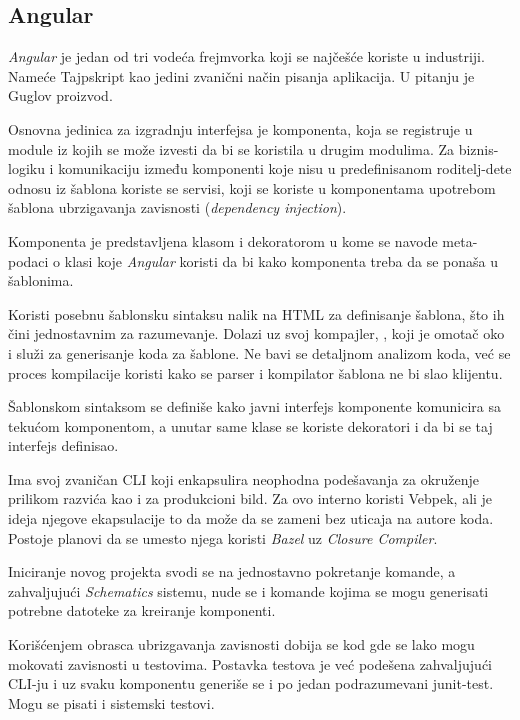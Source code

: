 \subsection{Angular}

\textsl{Angular} je jedan od tri vodeća frejmvorka koji se najčešće koriste u industriji.
Nameće Tajpskript kao jedini zvanični način pisanja aplikacija.
U pitanju je Guglov proizvod.

Osnovna jedinica za izgradnju interfejsa je komponenta, koja se registruje u module iz kojih se može izvesti da bi se koristila u drugim modulima.
Za biznis-logiku i komunikaciju između komponenti koje nisu u predefinisanom roditelj-dete odnosu iz šablona koriste se servisi, koji se koriste u komponentama upotrebom šablona ubrzigavanja zavisnosti (\textsl{dependency injection}).

Komponenta je predstavljena klasom i dekoratorom  u kome se navode meta-podaci o klasi koje \textsl{Angular} koristi da bi  kako komponenta treba da se ponaša u šablonima.

Koristi posebnu šablonsku sintaksu nalik na HTML za definisanje šablona, što ih čini jednostavnim za razumevanje.
Dolazi uz svoj kompajler, , koji je omotač oko  i služi za generisanje koda za šablone.
Ne bavi se detaljnom analizom koda, već se proces kompilacije koristi kako se parser i kompilator šablona ne bi slao klijentu.

Šablonskom sintaksom se definiše kako javni interfejs komponente komunicira sa tekućom komponentom, a unutar same klase se koriste dekoratori  i  da bi se taj interfejs definisao.

Ima svoj zvaničan CLI koji enkapsulira neophodna podešavanja za okruženje prilikom razvića kao i za produkcioni bild.
Za ovo interno koristi Vebpek, ali je ideja njegove ekapsulacije to da može da se zameni bez uticaja na autore koda.
Postoje planovi da se umesto njega koristi \textsl{Bazel} uz \textsl{Closure Compiler}.

Iniciranje novog projekta svodi se na jednostavno pokretanje komande, a zahvaljujući \textsl{Schematics} sistemu, nude se i komande kojima se mogu generisati potrebne datoteke za kreiranje komponenti.

Korišćenjem obrasca ubrizgavanja zavisnosti dobija se kod gde se lako mogu mokovati zavisnosti u testovima.
Postavka testova je već podešena zahvaljujući CLI-ju i uz svaku komponentu generiše se i po jedan podrazumevani junit-test.
Mogu se pisati i sistemski testovi.

